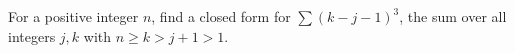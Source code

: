 For a positive integer $n$, find a closed form for $\displaystyle\sum(k-j-1)^3$, the sum over all integers $j,k$ with $n\ge k>j+1>1$.
